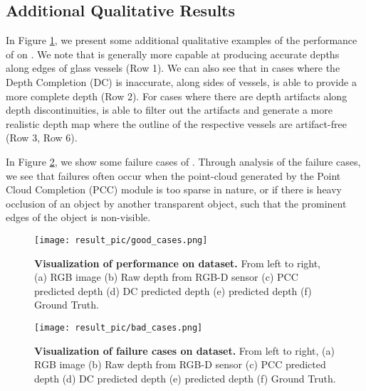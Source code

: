 \begin{table}[!t]
{\begin{tabular}{|c|c|c|c|c|c|c|c|c|}
\end{tabular}
}
\end{table}


\subsection{Additional Qualitative Results}

In Figure \ref{fig:transpare_success}, we present some additional qualitative examples of the performance of \algoName on \dataName. We note that \algoName is generally more capable at producing accurate depths along edges of glass vessels (Row 1). We can also see that in cases where the Depth Completion (DC) is inaccurate, along sides of vessels, \algoName is able to provide a more complete depth (Row 2). For cases where there are depth artifacts along depth discontinuities, \algoName is able to filter out the artifacts and generate a more realistic depth map where the outline of the respective vessels are artifact-free (Row 3, Row 6). 

In Figure \ref{fig:transpare_fail}, we show some failure cases of \algoName. Through analysis of the failure cases, we see that failures often occur when the point-cloud generated by the Point Cloud Completion (PCC) module is too sparse in nature, or if there is heavy occlusion of an object by another transparent object, such that the prominent edges of the object is non-visible.



\begin{figure}[t]
\centering
\texttt{[image: result\_pic/good\_cases.png]} \\
\caption{\textbf{Visualization of performance on \dataName dataset.} From left to right, (a) RGB image (b) Raw depth from RGB-D sensor (c) PCC predicted depth (d) DC predicted depth (e) \algoName predicted depth (f) Ground Truth.
}
\label{fig:transpare_success}
\end{figure}

\begin{figure}[t]
\centering
\texttt{[image: result\_pic/bad\_cases.png]} \\
\caption{\textbf{Visualization of failure cases on \dataName dataset.} From left to right, (a) RGB image (b) Raw depth from RGB-D sensor (c) PCC predicted depth (d) DC predicted depth (e) \algoName predicted depth (f) Ground Truth.
}
\label{fig:transpare_fail}
\end{figure}

